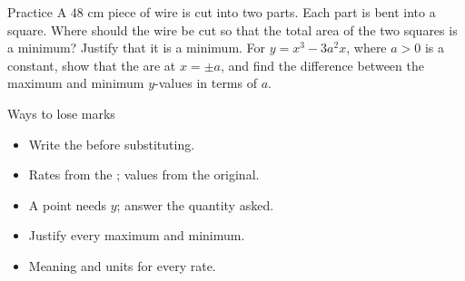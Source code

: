 \documentclass[aspectratio=169,11pt,t,xcolor=table]{beamer}
\begin{document}
\begin{frame}{Practice}\relax
{} A $48$ cm piece of wire is cut into two parts. Each part is bent into a square. Where should the wire be cut so that the total area of the two squares is a minimum? Justify that it is a minimum.
\vskip5mm
 For $y=x^{3}-3a^{2}x$, where $a>0$ is a constant, show that the \tturns are at $x=\pm a$, and find the difference between the maximum and minimum $y$-values in terms of $a$.
\end{frame}

\begin{frame}{Ways to lose marks}\relax
\begin{itemize}
\item[\lmnum{nocalc}] Write the \tderiv before substituting.
\item[\lmnum{wrongfn}] Rates from the \tderiv; values from the original.
\item[\lmnum{incomplete}] A point needs $y$; answer the quantity asked.
\item[\lmnum{nojust}] Justify every maximum and minimum.
\item[\lmnum{context}] Meaning and units for every rate.
\end{itemize}
\end{frame}
\end{document}
